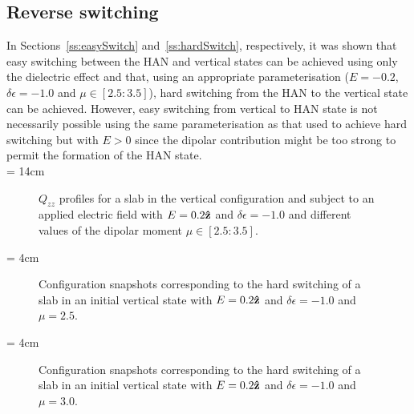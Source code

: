 \subsection{Reverse switching}

In Sections~\ref{ss:easySwitch} and~\ref{ss:hardSwitch}, respectively, it was shown that easy 
switching between the HAN and vertical states
can be achieved using only the dielectric effect and that,
using an appropriate parameterisation  ($E=-0.2$, $\delta\epsilon = -1.0$ and $\mu \in
[2.5:3.5]$), hard switching from the HAN to the vertical state can be achieved. However, 
easy switching from vertical to HAN state is not necessarily possible using the same
parameterisation as that used to achieve hard switching but with $E>0$ since the dipolar
contribution
might be too strong to permit the formation of the HAN state.\\


\picW = 14cm
\begin{figure}
	\centering
	\caption{$Q_{zz}$ profiles for a slab in the vertical configuration and 
	subject to an applied electric field with
	$E=0.2\mathbf{\hat{z} }$ and $\delta\epsilon = -1.0$ and different values of the 
	dipolar moment $\mu \in [2.5:3.5]$.}
	\label{fig:revSwitch_QzzmuInfl}
\end{figure}

\picW = 4cm
\begin{figure}
	\centering
	\caption{Configuration snapshots corresponding to the hard switching of a slab in an
	initial vertical state with $E=0.2\mathbf{\hat{z} }$ and $\delta\epsilon = -1.0$ and $\mu = 2.5$.}
	\label{fig:revSwitch_snaps2.5}
\end{figure}

\picW = 4cm
\begin{figure}
	\centering
	\caption{Configuration snapshots corresponding to the hard switching of a slab in an
	initial vertical state with $E=0.2\mathbf{\hat{z} }$ and $\delta\epsilon = -1.0$ and $\mu = 3.0$.}
	\label{fig:revSwitch_snaps3.0}
\end{figure}

